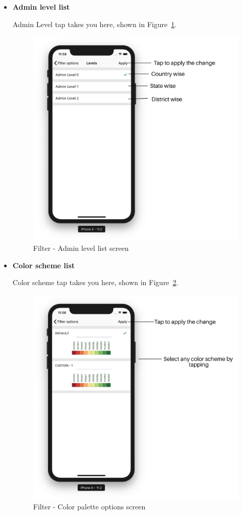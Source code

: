 \begin{itemize}
\begin{itemize}
        \item \textbf{Admin level list}
        
        Admin Level tap takes you here, shown in Figure~\ref{fig:level_list_screen}.
        
         \begin{figure}[H]
            \centering
            \includegraphics[width=0.50\linewidth]{figures/ch2/level_list.png}
            \caption{\label{fig:level_list_screen} Filter - Admin level list screen}
        \end{figure}

     \item \textbf{Color scheme list}
     
     Color scheme tap takes you here, shown in Figure~\ref{fig:color_scheme}.
        
        \begin{figure}[H]
            \centering
            \includegraphics[width=0.50\linewidth]{figures/ch2/color_scheme.png}
            \caption{\label{fig:color_scheme} Filter - Color palette  options screen}
        \end{figure}
        
    \end{itemize}

\end{itemize}



